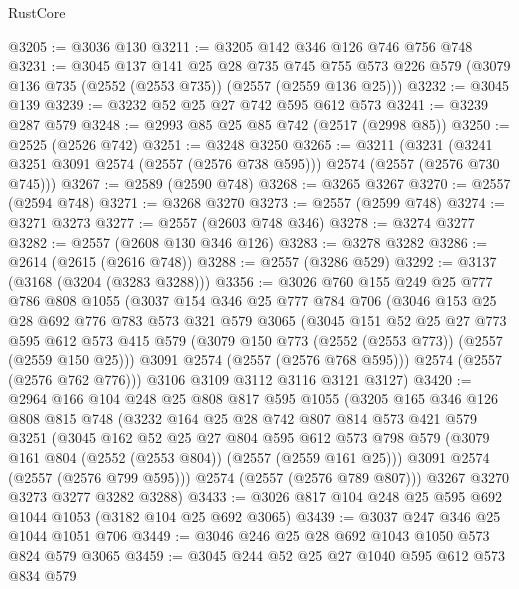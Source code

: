 \begin{lexlean}{RustCore}
\begin{coremodule}
@3205 := @3036 @130
@3211 := @3205 @142 @346 @126 @746 @756 @748
@3231 := @3045
    @137
    @141
    @25
    @28
    @735
    @745
    @755
    @573
    @226
    @579
    (@3079 @136 @735 (@2552 (@2553 @735)) (@2557 (@2559 @136 @25)))
@3232 := @3045 @139
@3239 := @3232 @52 @25 @27 @742 @595 @612 @573
@3241 := @3239 @287 @579
@3248 := @2993 @85 @25 @85 @742 (@2517 (@2998 @85))
@3250 := @2525 (@2526 @742)
@3251 := @3248 @3250
@3265 := @3211
    (@3231 (@3241 @3251 @3091 @2574 (@2557 (@2576 @738 @595))) @2574 (@2557 (@2576 @730 @745)))
@3267 := @2589 (@2590 @748)
@3268 := @3265 @3267
@3270 := @2557 (@2594 @748)
@3271 := @3268 @3270
@3273 := @2557 (@2599 @748)
@3274 := @3271 @3273
@3277 := @2557 (@2603 @748 @346)
@3278 := @3274 @3277
@3282 := @2557 (@2608 @130 @346 @126)
@3283 := @3278 @3282
@3286 := @2614 (@2615 (@2616 @748))
@3288 := @2557 (@3286 @529)
@3292 := @3137 (@3168 (@3204 (@3283 @3288)))
@3356 := @3026
    @760
    @155
    @249
    @25
    @777
    @786
    @808
    @1055
    (@3037
      @154
      @346
      @25
      @777
      @784
      @706
      (@3046
        @153
        @25
        @28
        @692
        @776
        @783
        @573
        @321
        @579
        @3065
        (@3045
          @151
          @52
          @25
          @27
          @773
          @595
          @612
          @573
          @415
          @579
          (@3079 @150 @773 (@2552 (@2553 @773)) (@2557 (@2559 @150 @25)))
          @3091
          @2574
          (@2557 (@2576 @768 @595)))
        @2574
        (@2557 (@2576 @762 @776)))
      @3106
      @3109
      @3112
      @3116
      @3121
      @3127)
@3420 := @2964
    @166
    @104
    @248
    @25
    @808
    @817
    @595
    @1055
    (@3205
      @165
      @346
      @126
      @808
      @815
      @748
      (@3232
        @164
        @25
        @28
        @742
        @807
        @814
        @573
        @421
        @579
        @3251
        (@3045
          @162
          @52
          @25
          @27
          @804
          @595
          @612
          @573
          @798
          @579
          (@3079 @161 @804 (@2552 (@2553 @804)) (@2557 (@2559 @161 @25)))
          @3091
          @2574
          (@2557 (@2576 @799 @595)))
        @2574
        (@2557 (@2576 @789 @807)))
      @3267
      @3270
      @3273
      @3277
      @3282
      @3288)
@3433 := @3026 @817 @104 @248 @25 @595 @692 @1044 @1053 (@3182 @104 @25 @692 @3065)
@3439 := @3037 @247 @346 @25 @1044 @1051 @706
@3449 := @3046 @246 @25 @28 @692 @1043 @1050 @573 @824 @579 @3065
@3459 := @3045 @244 @52 @25 @27 @1040 @595 @612 @573 @834 @579

\end{coremodule}
\end{lexlean}
